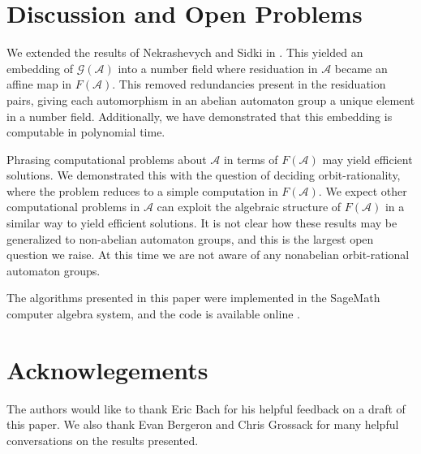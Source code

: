 \documentclass[12pt, letterpaper]{article}
\newcommand{\A}{\mathcal A}
\newcommand{\gp}{\mathcal G}
\begin{document}
\section{Discussion and Open Problems}

We extended the results of Nekrashevych and Sidki in
\cite{nekrashevych2004automorphisms}.  This yielded an embedding of $\gp(\A)$
into a number field where residuation in $\A$ became an affine map in $F(\A)$.
This removed redundancies present in the residuation pairs, giving each
automorphism in an abelian automaton group a unique element in a number field.
Additionally, we have demonstrated that this embedding is computable in
polynomial time.

Phrasing computational problems about $\A$ in terms of $F(\A)$ may yield
efficient solutions. We demonstrated this with the question of deciding
orbit-rationality, where the problem reduces to a simple computation in
$F(\A)$. We expect other computational problems in $\A$ can exploit the
algebraic structure of $F(\A)$ in a similar way to yield efficient solutions.
It is not clear how these results may be generalized to non-abelian automaton
groups, and this is the largest open question we raise. At this time we are
not aware of any nonabelian orbit-rational automaton groups.

The algorithms presented in this paper were implemented in the SageMath
computer algebra system, and the code is available online \cite{Becker2018}.

\section{Acknowlegements}
The authors would like to thank Eric Bach for his helpful feedback on a draft
of this paper. We also thank Evan Bergeron and Chris Grossack for many helpful
conversations on the results presented.

\printbibliography
\end{document}
